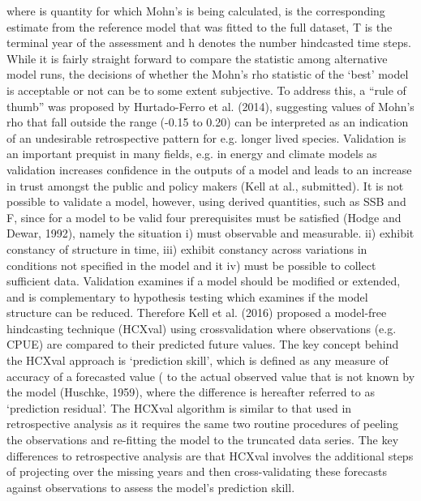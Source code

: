 where  is quantity for which Mohn’s is being calculated,  is the corresponding estimate from the reference model that was fitted to the full dataset, T is the terminal year of the assessment and h denotes the number hindcasted time steps. While it is fairly straight forward to compare the  statistic among alternative model runs, the decisions of whether the Mohn’s rho statistic of the ‘best’ model is acceptable or not can be to some extent subjective. To address this, a “rule of thumb” was proposed by Hurtado-Ferro et al. (2014), suggesting values of Mohn’s rho that fall outside the range (-0.15 to 0.20) can be interpreted as an indication of an undesirable retrospective pattern for e.g. longer lived species.
Validation is an important prequist in many fields, e.g. in energy and climate models as validation increases confidence in the outputs of a model and leads to an increase in trust amongst the public and policy makers (Kell at al., submitted). It is not possible to validate a model, however, using derived quantities, such as SSB and F, since for a model to be valid four prerequisites must be satisfied (Hodge and Dewar, 1992), namely the situation i) must observable and measurable. ii) exhibit constancy of structure in time, iii) exhibit constancy across variations in conditions not specified in the model and it iv) must be possible to collect sufficient data. Validation examines if a model should be modified or extended, and is complementary to hypothesis testing which examines if the model structure can be reduced. Therefore Kell et al. (2016) proposed a model-free hindcasting technique (HCXval) using crossvalidation where observations (e.g. CPUE) are compared to their predicted future values. The key concept behind the HCXval approach is ‘prediction skill’, which is defined as any measure of accuracy of a forecasted value ( to the actual observed value that is  not known by the model (Huschke, 1959), where the difference  is hereafter referred to as ‘prediction residual’. The HCXval algorithm is similar to that used in retrospective analysis as it requires the same two routine procedures of peeling the observations and re-fitting the model to the truncated data series. The key differences to retrospective analysis are that HCXval involves the additional steps of projecting over the missing years and then cross-validating these forecasts against observations to assess the model’s prediction skill.
